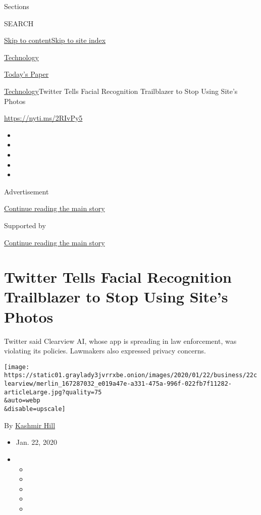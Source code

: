 Sections

SEARCH

\protect\hyperlink{site-content}{Skip to
content}\protect\hyperlink{site-index}{Skip to site index}

\href{https://www.nytimes3xbfgragh.onion/section/technology}{Technology}

\href{https://myaccount.nytimes3xbfgragh.onion/auth/login?response_type=cookie\&client_id=vi}{}

\href{https://www.nytimes3xbfgragh.onion/section/todayspaper}{Today's
Paper}

\href{/section/technology}{Technology}\textbar{}Twitter Tells Facial
Recognition Trailblazer to Stop Using Site's Photos

\url{https://nyti.ms/2RIvPy5}

\begin{itemize}
\item
\item
\item
\item
\item
\end{itemize}

Advertisement

\protect\hyperlink{after-top}{Continue reading the main story}

Supported by

\protect\hyperlink{after-sponsor}{Continue reading the main story}

\hypertarget{twitter-tells-facial-recognition-trailblazer-to-stop-using-sites-photos}{%
\section{Twitter Tells Facial Recognition Trailblazer to Stop Using
Site's
Photos}\label{twitter-tells-facial-recognition-trailblazer-to-stop-using-sites-photos}}

Twitter said Clearview AI, whose app is spreading in law enforcement,
was violating its policies. Lawmakers also expressed privacy concerns.

\texttt{[image: https://static01.graylady3jvrrxbe.onion/images/2020/01/22/business/22clearview/merlin\_167287032\_e019a47e-a331-475a-996f-022fb7f11282-articleLarge.jpg?quality=75\\\&auto=webp\\\&disable=upscale]}

By \href{https://www.nytimes3xbfgragh.onion/by/kashmir-hill}{Kashmir
Hill}

\begin{itemize}
\item
  Jan. 22, 2020
\item
  \begin{itemize}
  \item
  \item
  \item
  \item
  \item
  \end{itemize}
\end{itemize}

